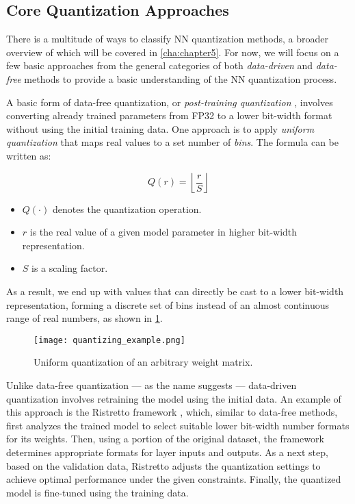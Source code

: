 
\subsection{Core Quantization Approaches}
\label{subsec:commonquantizationapproaches}
\hspace*{1em}There is a multitude of ways to classify NN quantization methods, a broader overview of which will be covered
in \cref{cha:chapter5}.
For now, we will focus on a few basic approaches from the general categories of both 
\textit{data-driven} and \textit{data-free} methods \cite{Edouard2022SPIQ} to provide a basic understanding of the NN quantization process.

A basic form of data-free quantization, or \textit{post-training quantization} \cite{jiang2021efficient},
involves converting already trained parameters from FP32 to a lower bit-width format
without using the initial training data. 
One approach is to apply \textit{uniform quantization} that maps real values to a set number
of \textit{bins}. The formula can be written as:

\[
Q(r) = \left\lfloor \frac{r}{S} \right\rfloor
\]

\begin{itemize}
    \item $Q(\cdot)$ denotes the quantization operation.
    \item $r$ is the real value of a given model parameter in higher bit-width representation.
    \item $S$ is a scaling factor.
\end{itemize}

As a result, we end up with values that can directly be cast to a lower bit-width representation,
forming a discrete set of bins instead of an almost continuous range of real numbers,
as shown in \cref{fig:quantizing_example}.
\begin{figure}[t!]
  \centering
  \texttt{[image: quantizing\_example.png]}
  \caption{Uniform quantization of an arbitrary weight matrix.}
  \label{fig:quantizing_example}
\end{figure}

Unlike data-free quantization  —  as the name suggests — data-driven quantization involves retraining the model
using the initial data. An example of this approach is the Ristretto framework \cite{DBLP:journals/tnn/GyselPMG18}, which, similar to data-free methods, 
first analyzes the trained model to select suitable lower bit-width number formats for its weights.
Then, using a portion of the original dataset, the framework determines appropriate formats for layer inputs and outputs.
As a next step, based on the validation data, Ristretto adjusts the quantization settings to achieve optimal performance 
under the given constraints. Finally, the quantized model is fine-tuned using the training data.


